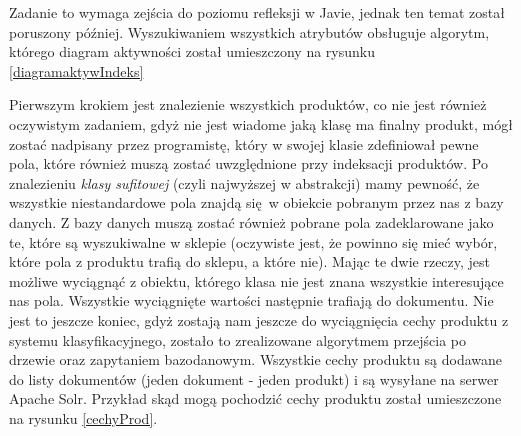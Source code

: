 Zadanie to wymaga zejścia do poziomu refleksji w Javie, jednak ten temat został poruszony później. Wyszukiwaniem wszystkich atrybutów obsługuje algorytm, którego diagram aktywności został umieszczony na rysunku \ref{diagramaktywIndeks}

Pierwszym krokiem jest znalezienie wszystkich produktów, co nie jest również oczywistym zadaniem, gdyż nie jest wiadome jaką klasę ma finalny produkt, mógł zostać nadpisany przez programistę, który w swojej klasie zdefiniował pewne pola, które również muszą zostać uwzględnione przy indeksacji produktów. Po znalezieniu \textit{klasy sufitowej} (czyli najwyższej w abstrakcji) mamy pewność, że wszystkie niestandardowe pola znajdą się w obiekcie pobranym przez nas z bazy danych. Z bazy danych muszą zostać również pobrane pola zadeklarowane jako te, które są wyszukiwalne w sklepie (oczywiste jest, że powinno się mieć wybór, które pola z produktu trafią do sklepu, a które nie). Mając te dwie rzeczy, jest możliwe wyciągnąć z obiektu, którego klasa nie jest znana wszystkie interesujące nas pola. Wszystkie wyciągnięte wartości następnie trafiają do dokumentu. Nie jest to jeszcze koniec, gdyż zostają nam jeszcze do wyciągnięcia cechy produktu z systemu klasyfikacyjnego, zostało to zrealizowane algorytmem przejścia po drzewie oraz zapytaniem bazodanowym. Wszystkie cechy produktu są dodawane do listy dokumentów (jeden dokument - jeden produkt) i są wysyłane na serwer Apache Solr. Przykład skąd mogą pochodzić cechy produktu został umieszczone na rysunku \ref{cechyProd}.
